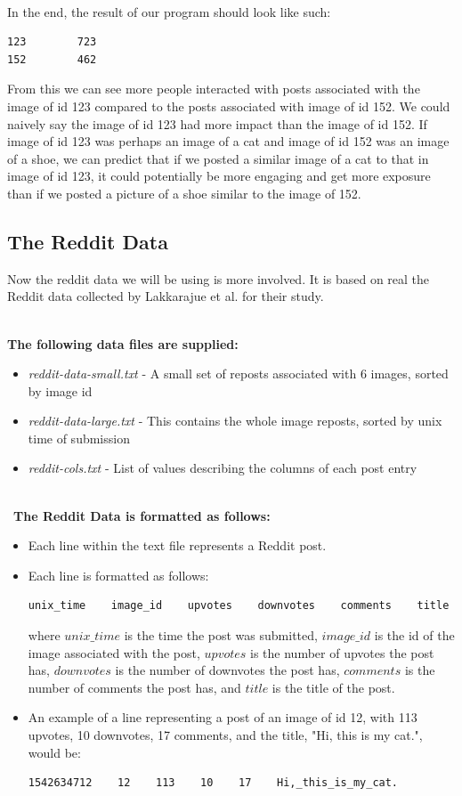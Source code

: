 \documentclass{article}
\begin{document}
\-\ \\In the end, the result of our program should look like such:
\begin{lstlisting}[language=bash]
123        723
152        462
\end{lstlisting}
From this we can see more people interacted with posts associated with the  image of id 123 compared to the posts associated with image of id 152. We could naively say the image of id 123 had more impact than the image of id 152. If image of id 123 was perhaps an image of a cat and image of id 152 was an image of a shoe, we can predict that if we posted a similar image of a cat to that in image of id 123, it could potentially be more engaging and get more exposure than if we posted a picture of a shoe similar to the image of 152.

\subsection*{The Reddit Data}
Now the reddit data we will be using is more involved. It is based on real the Reddit data collected by Lakkarajue et al. for their study.

\-\ \\ \textbf{The following data files are supplied:}
\begin{itemize}
    \item \textit{reddit-data-small.txt} - A small set of reposts associated with 6 images, sorted by image id
    \item \textit{reddit-data-large.txt} - This contains the whole image reposts, sorted by unix time of submission
    \item \textit{reddit-cols.txt} - List of values describing the columns of each post entry
\end{itemize}

\-\\\ \textbf{The Reddit Data is formatted as follows:}
\begin{itemize}
    \item Each line within the text file represents a Reddit post. 
    \item Each line is formatted as follows: 
             \begin{lstlisting}[language=bash]
 unix_time    image_id    upvotes    downvotes    comments    title
             \end{lstlisting}
             where $unix\_time$ is the time the post was submitted, $image\_id$ is the id of the image associated with the post, $upvotes$ is the number of upvotes the post has, $downvotes$ is the number of downvotes the post has, $comments$ is the number of comments the post has, and $title$ is the title of the post. 
    \item An example of a line representing a post of an image of id 12, with 113 upvotes, 10 downvotes, 17 comments, and the title, "Hi, this is my cat.", would be: 
                 \begin{lstlisting}[language=bash]
 1542634712    12    113    10    17    Hi,_this_is_my_cat.
             \end{lstlisting}
\end{itemize}
\end{document}

